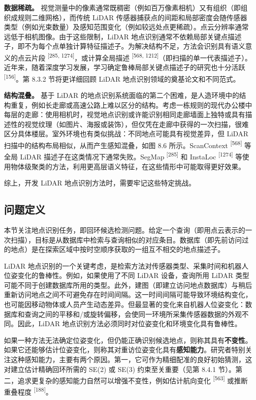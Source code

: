 \textbf{数据稀疏。} 视觉测量中的像素通常既稠密（例如百万像素相机）又有组织（即组织成规则二维网格），而传统 LiDAR 传感器捕获点的间距和局部密度会随传感器类型（例如光束数量）及感知范围变化（例如较远处点更稀疏）。点云分辨率通常远低于相机图像。由于这些限制，LiDAR 地点识别通常不依赖局部关键点描述子，即不为每个点单独计算特征描述子。为解决结构不足，方法会识别具有语义意义的点云片段 \textsuperscript{[285, 1274]}，或计算全局描述 \textsuperscript{[568, 1212]}（即扫描的单一代表描述子）。近年来，随着深度学习发展，学习确定鲁棒局部关键点描述子的研究也十分活跃 \textsuperscript{[156]}。第 8.3.2 节将更详细回顾 LiDAR 地点识别领域的奠基论文和不同范式。

\textbf{结构混叠。} 基于 LiDAR 的地点识别系统面临的第二个困难，是人造环境中的结构重复，例如长走廊或高速公路上难以区分的结构。考虑一栋规则的现代办公楼中每层的走廊：使用相机时，视觉地点识别或许能识别相同走廊墙面上独特或具有描述性的视觉纹理（如图片、海报或装饰），但仅凭在走廊中获得的一次扫描，很难区分具体楼层。室外环境也有类似挑战：不同地点可能具有视觉差异，但 LiDAR 扫描中的结构布局相似，从而产生感知混叠，如图 8.6 所示。ScanContext \textsuperscript{[568]} 等全局 LiDAR 描述子在这类情况下通常失败。SegMap \textsuperscript{[285]} 和 InstaLoc \textsuperscript{[1274]} 等使用物体级聚类的方法，利用更高层语义特征，在这些情形中可能取得更好效果。

综上，开发 LiDAR 地点识别方法时，需要牢记这些特定挑战。

\subsection{问题定义}

本节关注地点识别任务，即回环候选检测问题。给定一个查询（即用点云表示的一次扫描），目标是从数据库中检索与查询相似的对应条目。数据库（即先前访问过的地点）是在探索区域中按时空顺序获取的一组互不相交的地点描述子。

LiDAR 地点识别的一个关键考虑，是检索方法对传感器类型、采集时间和机器人位姿变化的鲁棒性。例如，如果使用了不同 LiDAR 设备，查询所用 LiDAR 类型可能不同于创建数据库所用的类型。此外，建图（即建立访问地点数据库）与稍后重新访问地点之间不可避免存在时间间隔。这一时间间隔可能导致环境结构变化，也可能因移动物体或人员产生动态差异。但最显著的变化来自机器人位姿变化：数据库和查询之间的平移和/或旋转偏移，会使同一环境所采集传感器数据的外观不同。因此，LiDAR 地点识别方法必须同时对位姿变化和环境变化具有鲁棒性。

如果一种方法无法确定位姿变化，但仍能正确识别候选地点，则称其具有\textbf{不变性}。如果它还能够估计位姿变化，则称其对重访位姿变化具有\textbf{感知能力}。研究者特别关注这种感知能力，主要有两个原因。第一，它可作为精细配准的良好初始猜测，这对建立估计精确回环所需的 SE(2) 或 SE(3) 约束至关重要（见第 8.4.1 节）。第二，追求更复杂的感知能力自然可以增强不变性，例如估计航向变化 \textsuperscript{[563]} 或推断重叠程度 \textsuperscript{[188]}。

